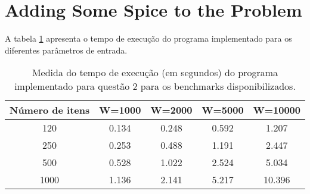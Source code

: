 \documentclass[a4paper, 11pt]{article}
\begin{document}
\section{Adding Some Spice to the Problem}

\iffalse
Implement the proposed algorithm, and verify if its theoretical complexity is attained, in
practice, on the benchmark instances provided with the project.
\fi

A tabela \ref{tab:benchq2} apresenta o tempo de execução do programa implementado para os diferentes parâmetros de entrada.

\begin{table}[H]
\centering
\begin{tabular}{c|c|c|c|c}
Número de itens & W=1000 & W=2000 & W=5000 & W=10000 \\
\hline
120 & 0.134 & 0.248 & 0.592 & 1.207 \\
250 & 0.253 & 0.488 & 1.191 & 2.447 \\
500 & 0.528 & 1.022 & 2.524 & 5.034 \\
1000 & 1.136 & 2.141 & 5.217 & 10.396 \\
\end{tabular}
\caption{Medida do tempo de execução (em segundos) do programa implementado para questão 2 para os benchmarks disponibilizados.}
\label{tab:benchq2}
\end{table}
\end{document}
